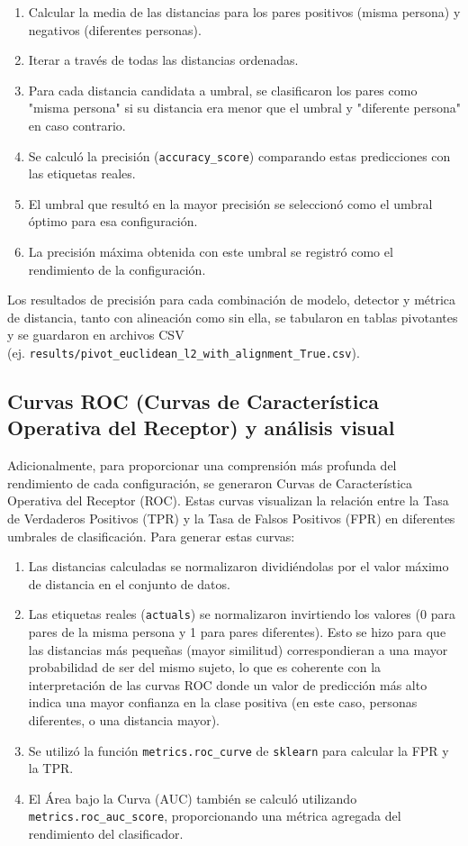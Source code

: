 \begin{enumerate}
	\item Calcular la media de las distancias para los pares positivos (misma persona) y negativos (diferentes personas).
	\item Iterar a través de todas las distancias ordenadas.
	\item Para cada distancia candidata a umbral, se clasificaron los pares como "misma persona" si su distancia era menor que el umbral y "diferente persona" en caso contrario.
	\item Se calculó la precisión (\texttt{accuracy\_score}) comparando estas predicciones con las etiquetas reales.
	\item El umbral que resultó en la mayor precisión se seleccionó como el umbral óptimo para esa configuración.
	\item La precisión máxima obtenida con este umbral se registró como el rendimiento de la configuración.
\end{enumerate}
Los resultados de precisión para cada combinación de modelo, detector y métrica de distancia, tanto con alineación como sin ella, se tabularon en tablas pivotantes y se guardaron en archivos CSV \\ (ej. \texttt{results/pivot\_euclidean\_l2\_with\_alignment\_True.csv}).

\subsection{Curvas ROC (Curvas de Característica Operativa del Receptor) y análisis visual}

Adicionalmente, para proporcionar una comprensión más profunda del rendimiento de cada configuración, se generaron Curvas de Característica Operativa del Receptor (ROC). Estas curvas visualizan la relación entre la Tasa de Verdaderos Positivos (TPR) y la Tasa de Falsos Positivos (FPR) en diferentes umbrales de clasificación. Para generar estas curvas:

\begin{enumerate}
	\item Las distancias calculadas se normalizaron dividiéndolas por el valor máximo de distancia en el conjunto de datos.
	\item Las etiquetas reales (\texttt{actuals}) se normalizaron invirtiendo los valores (0 para pares de la misma persona y 1 para pares diferentes). Esto se hizo para que las distancias más pequeñas (mayor similitud) correspondieran a una mayor probabilidad de ser del mismo sujeto, lo que es coherente con la interpretación de las curvas ROC donde un valor de predicción más alto indica una mayor confianza en la clase positiva (en este caso, personas diferentes, o una distancia mayor).
	\item Se utilizó la función \texttt{metrics.roc\_curve} de \texttt{sklearn} para calcular la FPR y la TPR.
	\item El Área bajo la Curva (AUC) también se calculó utilizando \texttt{metrics.roc\_auc\_score}, proporcionando una métrica agregada del rendimiento del clasificador.
\end{enumerate}

